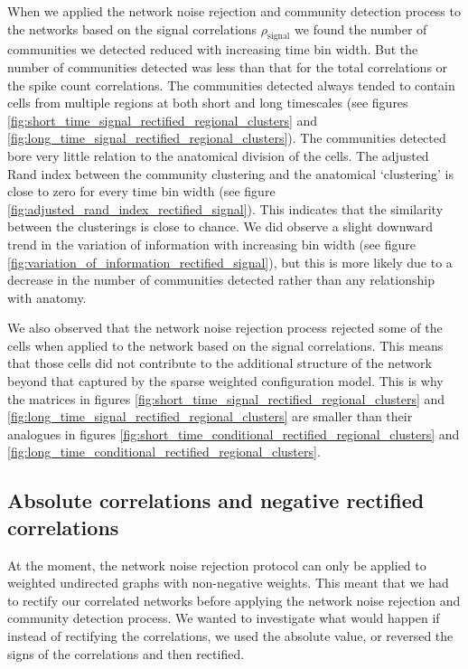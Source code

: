   When we applied the network noise rejection and community detection process to the networks based on the signal correlations $\rho_{\text{signal}}$ we found the number of communities we detected reduced with increasing time bin width. But the number of communities detected was less than that for the total correlations or the spike count correlations. The communities detected always tended to contain cells from multiple regions at both short and long timescales (see figures \ref{fig:short_time_signal_rectified_regional_clusters} and \ref{fig:long_time_signal_rectified_regional_clusters}). The communities detected bore very little relation to the anatomical division of the cells. The adjusted Rand index between the community clustering and the anatomical `clustering' is close to zero for every time bin width (see figure \ref{fig:adjusted_rand_index_rectified_signal}). This indicates that the similarity between the clusterings is close to chance. We did observe a slight downward trend in the variation of information with increasing bin width (see figure \ref{fig:variation_of_information_rectified_signal}), but this is more likely due to a decrease in the number of communities detected rather than any relationship with anatomy.

  We also observed that the network noise rejection process rejected some of the cells when applied to the network based on the signal correlations. This means that those cells did not contribute to the additional structure of the network beyond that captured by the sparse weighted configuration model. This is why the matrices in figures \ref{fig:short_time_signal_rectified_regional_clusters} and \ref{fig:long_time_signal_rectified_regional_clusters} are smaller than their analogues in figures \ref{fig:short_time_conditional_rectified_regional_clusters} and \ref{fig:long_time_conditional_rectified_regional_clusters}.


  \subsection{Absolute correlations and negative rectified correlations}
  At the moment, the network noise rejection protocol can only be applied to weighted undirected graphs with non-negative weights. This meant that we had to rectify our correlated networks before applying the network noise rejection and community detection process. We wanted to investigate what would happen if instead of rectifying the correlations, we used the absolute value, or reversed the signs of the correlations and then rectified.

